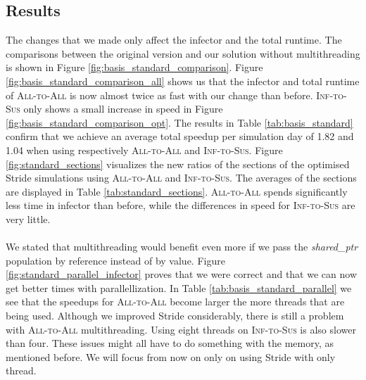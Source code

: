 \subsection{Results}
The changes that we made only affect the infector and the total runtime. The comparisons between the original version and our solution without multithreading is shown in Figure \ref{fig:basis_standard_comparison}. Figure \ref{fig:basis_standard_comparison_all} shows us that the infector and total runtime of \textsc{All-to-All} is now almost twice as fast with our change than before. \textsc{Inf-to-Sus} only shows a small increase in speed in Figure \ref{fig:basis_standard_comparison_opt}. The results in Table \ref{tab:basis_standard} confirm that we achieve an average total speedup per simulation day of 1.82 and 1.04 when using respectively \textsc{All-to-All} and \textsc{Inf-to-Sus}. Figure \ref{fig:standard_sections} visualizes the new ratios of the sections of the optimised Stride simulations using \textsc{All-to-All} and \textsc{Inf-to-Sus}. The averages of the sections are displayed in Table \ref{tab:standard_sections}. \textsc{All-to-All} spends significantly less time in infector than before, while the differences in speed for \textsc{Inf-to-Sus} are very little.
\\\\
We stated that multithreading would benefit even more if we pass the \textit{shared\_ptr} population by reference instead of by value. Figure \ref{fig:standard_parallel_infector} proves that we were correct and that we can now get better times with parallellization. In Table \ref{tab:basis_standard_parallel} we see that the speedups for \textsc{All-to-All} become larger the more threads that are being used. Although we improved Stride considerably, there is still a problem with \textsc{All-to-All} multithreading. Using eight threads on \textsc{Inf-to-Sus} is also slower than four. These issues might all have to do something with the memory, as mentioned before. We will focus from now on only on using Stride with only thread.

